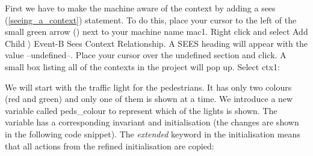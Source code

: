 



First we have to make the machine aware of the context by adding a \textsf{sees} (\ref{seeing_a_context}) statement. To do this, place your cursor to the left of the small green arrow () next to your machine name \textsf{mac1}. Right click and select \textsf{Add Child $\rangle$ Event-B Sees Context Relationship}. A \textsf{SEES} heading will appear with the value \textsf{--undefined--}. Place your cursor over the undefined section and click. A small box listing all of the contexts in the project will pop up. Select \textsf{ctx1}:


We will start with the traffic light for the pedestrians. It has only two colours (red and green) and only one of them is shown at a time.  We introduce a new variable called \textsf{peds\_colour} to represent which of the lights is shown. The variable has a corresponding invariant and initialisation (the changes are shown in the following code snippet). The \textit{extended}	keyword in the initialisation means that all
actions from the refined initialisation are copied:


